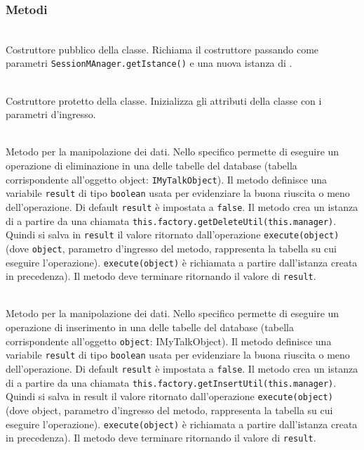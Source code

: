 \subsubsection*{Metodi}

\begin{description}
	\item{}\\
	Costruttore pubblico della classe. Richiama il costruttore  passando come parametri \texttt{SessionMAnager.getIstance()} e una nuova istanza di .
	
	\item{}\\
	Costruttore protetto della classe. Inizializza gli attributi della classe con i parametri d'ingresso.
	
	\item{}\\
	Metodo per la manipolazione dei dati. Nello specifico permette di eseguire un operazione di eliminazione in una delle tabelle del database (tabella corrispondente all'oggetto object: \texttt{IMyTalkObject}). Il metodo definisce una variabile \texttt{result} di tipo \texttt{boolean} usata per evidenziare la buona riuscita o meno dell'operazione. Di default \texttt{result} è impostata a \texttt{false}. Il metodo crea un istanza di  a partire da una chiamata \verb|this.factory.getDeleteUtil(this.manager)|. Quindi si salva in \texttt{result} il valore ritornato dall'operazione \verb|execute(object)| (dove \texttt{object}, parametro d'ingresso del metodo, rappresenta la tabella su cui eseguire l'operazione). \verb|execute(object)| è richiamata a partire dall'istanza  creata in precedenza). Il metodo deve terminare ritornando il valore di \texttt{result}.
	
	
	\item{}\\
	Metodo per la manipolazione dei dati. Nello specifico permette di eseguire un operazione di inserimento in una delle tabelle del database (tabella corrispondente all'oggetto \texttt{object}: {IMyTalkObject}). Il metodo definisce una variabile \texttt{result} di tipo \texttt{boolean} usata per evidenziare la buona riuscita o meno dell'operazione. Di default \texttt{result} è impostata a \texttt{false}. Il metodo crea un istanza di  a partire da una chiamata \verb|this.factory.getInsertUtil(this.manager)|. Quindi si salva in result il valore ritornato dall'operazione \verb|execute(object)| (dove object, parametro d'ingresso del metodo, rappresenta la tabella su cui eseguire l'operazione). \verb|execute(object)| è richiamata a partire dall'istanza  creata in precedenza). Il metodo deve terminare ritornando il valore di  \texttt{result}.
	

\end{description}
